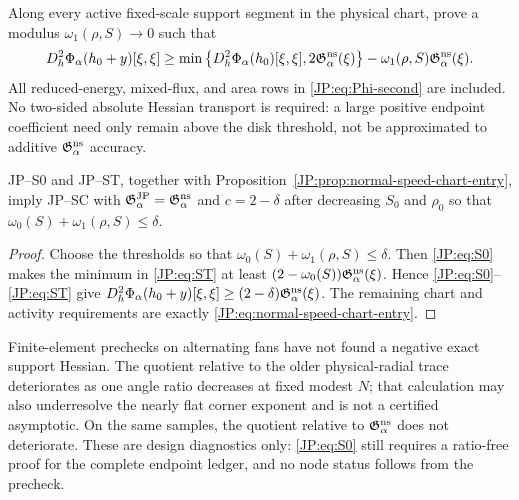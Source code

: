 \begin{remark}
\label{JP:rem:ST}
Along every active fixed-scale support segment in the physical chart,
prove a modulus $\omega_1(\rho,S)\to0$ such that
\begin{equation}\label{JP:eq:ST}
 D_h^2\Phi_\alpha(h_0+y)[\xi,\xi]
 \ge\min\left\{D_h^2\Phi_\alpha(h_0)[\xi,\xi],
                 2\mathfrak G_\alpha^{\rm ns}(\xi)\right\}
       -\omega_1(\rho,S)\mathfrak G_\alpha^{\rm ns}(\xi).
\end{equation}
All reduced-energy, mixed-flux, and area rows in
\eqref{JP:eq:Phi-second} are included.  No two-sided absolute Hessian
transport is required: a large positive endpoint coefficient need only
remain above the disk threshold, not be approximated to additive
$\mathfrak G_\alpha^{\rm ns}$ accuracy.
\end{remark}

\begin{proposition}
\label{JP:prop:SC-cut}
JP--S0 and JP--ST, together with
Proposition~\ref{JP:prop:normal-speed-chart-entry}, imply JP--SC with
$\mathfrak G^{\rm JP}_\alpha=\mathfrak G_\alpha^{\rm ns}$ and
$c=2-\delta$ after decreasing $S_0$ and $\rho_0$ so that
$\omega_0(S)+\omega_1(\rho,S)\le\delta$.
\end{proposition}

\begin{proof}
Choose the thresholds so that
$\omega_0(S)+\omega_1(\rho,S)\le\delta$.  Then
\eqref{JP:eq:S0} makes the minimum in \eqref{JP:eq:ST} at least
$(2-\omega_0(S))\mathfrak G_\alpha^{\rm ns}(\xi)$.  Hence
\eqref{JP:eq:S0}--\eqref{JP:eq:ST} give
$D_h^2\Phi_\alpha(h_0+y)[\xi,\xi]
\ge(2-\delta)\mathfrak G_\alpha^{\rm ns}(\xi)$.  The remaining chart and activity
requirements are exactly \eqref{JP:eq:normal-speed-chart-entry}.
\end{proof}

\begin{remark}
Finite-element prechecks on alternating fans have not found a negative
exact support Hessian.  The quotient relative to the older physical-radial
trace deteriorates as one angle ratio decreases at fixed modest $N$; that
calculation may also underresolve the nearly flat corner exponent and is
not a certified asymptotic.  On the same samples, the quotient relative to
$\mathfrak G_\alpha^{\rm ns}$ does not deteriorate.  These are design
diagnostics only: \eqref{JP:eq:S0} still requires a ratio-free proof for the
complete endpoint ledger, and no node status follows from the precheck.
\end{remark}

